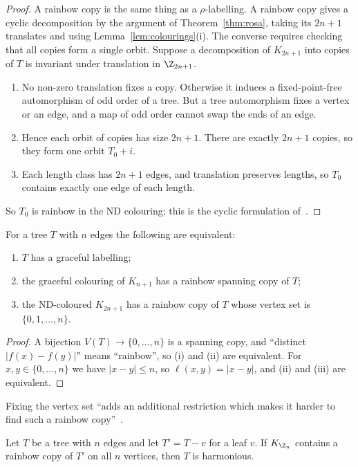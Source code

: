 \begin{proof}
A rainbow copy is the same thing as a $\rho$-labelling. A rainbow copy gives a cyclic decomposition by the argument of Theorem~\ref{thm:rosa}, taking its $2n+1$ translates and using Lemma~\ref{lem:colourings}(i). The converse requires checking that all copies form a single orbit. Suppose a decomposition of $K_{2n+1}$ into copies of $T$ is invariant under translation in $\Z_{2n+1}$.
\begin{enumerate}
\item No non-zero translation fixes a copy. Otherwise it induces a fixed-point-free automorphism of odd order of a tree. But a tree automorphism fixes a vertex or an edge, and a map of odd order cannot swap the ends of an edge.
\item Hence each orbit of copies has size $2n+1$. There are exactly $2n+1$ copies, so they form one orbit $T_0+i$.
\item Each length class has $2n+1$ edges, and translation preserves lengths, so $T_0$ contains exactly one edge of each length.
\end{enumerate}
So $T_0$ is rainbow in the ND colouring; this is the cyclic formulation of~\cite[\S1]{mps20}.
\end{proof}

\begin{proposition}\label{prop:graceful}
For a tree $T$ with $n$ edges the following are equivalent:
\begin{enumerate}
\item $T$ has a graceful labelling;
\item the graceful colouring of $K_{n+1}$ has a rainbow spanning copy of $T$;
\item the ND-coloured $K_{2n+1}$ has a rainbow copy of $T$ whose vertex set is $\{0,1,\dots,n\}$.
\end{enumerate}
\end{proposition}

\begin{proof}
A bijection $V(T)\to\{0,\dots,n\}$ is a spanning copy, and ``distinct $|f(x)-f(y)|$'' means ``rainbow'', so (i) and (ii) are equivalent. For $x,y\in\{0,\dots,n\}$ we have $|x-y|\leq n$, so $\ell(x,y)=|x-y|$, and (ii) and (iii) are equivalent.
\end{proof}

Fixing the vertex set ``adds an additional restriction which makes it harder to find such a rainbow copy''~\cite[\S1]{mps20}.

\begin{proposition}\label{prop:harm}
Let $T$ be a tree with $n$ edges and let $T'=T-v$ for a leaf $v$. If $K_{\Z_n}$ contains a rainbow copy of $T'$ on all $n$ vertices, then $T$ is harmonious.
\end{proposition}

